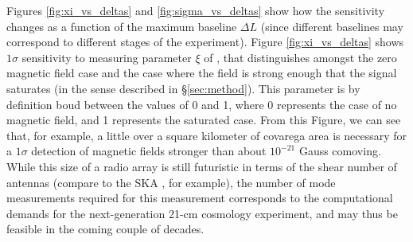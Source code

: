 Figures \ref{fig:xi_vs_deltas} and \ref{fig:sigma_vs_deltas} show how the sensitivity changes as a function of the maximum baseline $\Delta L$ (since different baselines may correspond to different stages of the experiment). Figure \ref{fig:xi_vs_deltas} shows $1\sigma$ sensitivity to measuring parameter $\xi$ of \eq{\ref{eq:saturated_P}}, that distinguishes amongst the zero magnetic field case and the case where the field is strong enough that the signal saturates (in the sense described in \S\ref{sec:method}). This parameter is by definition boud between the values of 0 and 1, where 0 represents the case of no magnetic field, and 1 represents the saturated case. From this Figure, we can see that, for example, a little over a square kilometer of covarega area is necessary for a $1\sigma$ detection of magnetic fields stronger than about $10^{-21}$ Gauss comoving. While this size of a radio array is still futuristic in terms of the shear number of antennas (compare to the SKA \cite{2008arXiv0802.1727C}, for example), the number of mode measurements required for this measurement corresponds to the computational demands for the next-generation 21-cm cosmology experiment, and may thus be feasible in the coming couple of decades. 

